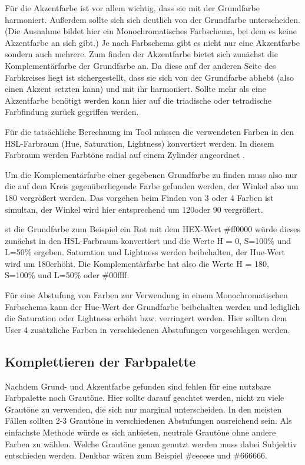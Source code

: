 Für die Akzentfarbe ist vor allem wichtig, dass sie mit der Grundfarbe harmoniert. Außerdem sollte sich sich deutlich von der Grundfarbe unterscheiden. (Die Ausnahme bildet hier ein Monochromatisches Farbschema, bei dem es keine Akzentfarbe an sich gibt.) Je nach Farbschema gibt es nicht nur eine Akzentfarbe sondern auch mehrere.
Zum finden der Akzentfarbe bietet sich zunächst die Komplementärfarbe der Grundfarbe an. Da diese auf der anderen Seite des Farbkreises liegt ist sichergestellt, dass sie sich von der Grundfarbe abhebt (also einen Akzent setzten kann) und mit ihr harmoniert. Sollte mehr als eine Akzentfarbe benötigt werden kann hier auf die triadische oder tetradische Farbfindung zurück gegriffen werden.

Für die tatsächliche Berechnung im Tool müssen die verwendeten Farben in den HSL-Farbraum (Hue, Saturation, Lightness) konvertiert werden. In diesem Farbraum werden Farbtöne radial auf einem Zylinder angeordnet \cite{joblove1978color}.

Um die Komplementärfarbe einer gegebenen Grundfarbe zu finden muss also nur die auf dem Kreis gegenüberliegende Farbe gefunden werden, der Winkel also um 180 \degree vergrößert werden. Das vorgehen beim Finden von 3 oder 4 Farben ist simultan, der Winkel wird hier entsprechend um 120\degree oder 90 \degree vergrößert.

st die Grundfarbe zum Beispiel ein Rot mit dem HEX-Wert \#ff0000 würde dieses zunächst in den HSL-Farbraum konvertiert und die Werte H = 0\degree, S=100\% und L=50\% ergeben. Saturation und Lightness werden beibehalten, der Hue-Wert wird um 180\degree erhöht. Die Komplementärfarbe hat also die Werte  H = 180\degree, S=100\% und L=50\% oder \#00ffff.

Für eine Abstufung von Farben zur Verwendung in einem Monochromatischen Farbschema kann der Hue-Wert der Grundfarbe beibehalten werden und lediglich die Saturation oder Lightness erhöht bzw. verringert werden. Hier sollten dem User 4 zusätzliche Farben in verschiedenen Abstufungen vorgeschlagen werden.

\subsection{Komplettieren der Farbpalette}

Nachdem Grund- und Akzentfarbe gefunden sind fehlen für eine nutzbare Farbpalette noch Grautöne.  Hier sollte darauf geachtet werden, nicht zu viele Grautöne zu verwenden, die sich nur marginal unterscheiden. In den meisten Fällen sollten 2-3 Grautöne in verschiedenen Abstufungen ausreichend sein.
Als einfachste Methode würde es sich anbieten, neutrale Grautöne ohne andere Farben zu wählen. Welche Grautöne genau genutzt werden muss dabei Subjektiv entschieden werden. Denkbar wären zum Beispiel \#eeeeee und \#666666.

